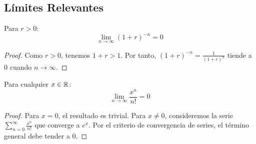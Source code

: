 \subsection{Límites Relevantes}

\begin{teorema}[Límite de $(1 + r)^{-n}$]
Para $r > 0$:
\begin{equation}
\lim_{n \to \infty} (1 + r)^{-n} = 0
\end{equation}
\end{teorema}

\begin{proof}
Como $r > 0$, tenemos $1 + r > 1$. Por tanto, $(1 + r)^{-n} = \frac{1}{(1 + r)^n}$ tiende a 0 cuando $n \to \infty$.
\end{proof}

\begin{teorema}
Para cualquier $x \in \mathbb{R}$:
\begin{equation}
\lim_{n \to \infty} \frac{x^n}{n!} = 0
\end{equation}
\end{teorema}

\begin{proof}
Para $x = 0$, el resultado es trivial. Para $x \neq 0$, consideremos la serie $\sum_{n=0}^{\infty} \frac{x^n}{n!}$ que converge a $e^x$. Por el criterio de convergencia de series, el término general debe tender a 0.
\end{proof}



